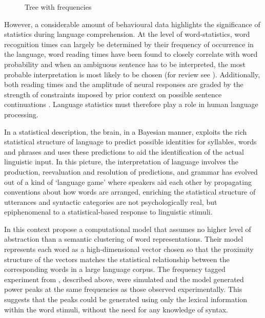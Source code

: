 \documentclass[a4paper,10pt,twoside]{article}
\begin{document}
\begin{figure}[tb]
\begin{center}
\end{center}
\caption{Tree with frequencies \label{fig:freq_tree}}
\end{figure}

However, a considerable amount of behavioural data highlights the
significance of statistics during language comprehension. At the level
of word-statistics, word recognition times can largely be determined
by their frequency of occurrence in the language, word reading times
have been found to closely correlate with word probability and when an
ambiguous sentence has to be interpreted, the most probable
interpretation is most likely to be chosen (for review see
\cite{Jurafsky2002}). Additionally, both reading times and the
amplitude of neural responses are graded by the strength of
constraints imposed by prior context on possible sentence
continuations \cite{GibsonPearlmutter1998}. Language statistics must
therefore play a role in human language processing. 

In a statistical description, the brain, in a
Bayesian manner, exploits the rich statistical structure of language
to predict possible identities for syllables, words and phrases and
uses these predictions to aid the identification of the actual
linguistic input. In this picture, the interpretation of language
involves the production, reevaluation and resolution of predictions,
and grammar has evolved out of a kind of \lq{}language game\rq{} where
speakers aid each other by propagating conventions about how words are
arranged, enriching the statistical structure of utterances and syntactic categories are not psychologically real, but epiphenomenal to a statistical-based response to linguistic
stimuli.

In this context \cite{FrankYang2018} propose a computational model that
assumes no higher level of abstraction than a semantic
clustering of word representations. Their model represents each word
as a high-dimensional vector chosen so that the proximity structure of
the vectors matches the statistical relationship between the
corresponding words in a large language corpus. The frequency tagged
experiment from \cite{DingEtAl2016}, described above, were simulated
and the model generated power peaks at the same frequencies as those
observed experimentally. This suggests that the peaks could be
generated using only the lexical information within the word stimuli,
without the need for any knowledge of syntax. 
\end{document}
